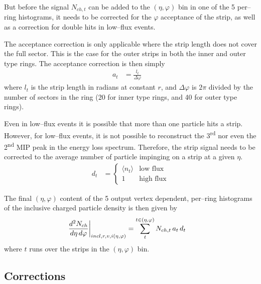 \documentclass[11pt]{article}
\newcommand{\dndetadphi}[1][]{{\ensuremath%
    \ifx|#1|\else\left.\fi%
    \frac{d^2N_{ch}}{d\eta\,d\varphi}%
    \ifx|#1|\else\right|_{#1}\fi%
}}
\begin{document}
But before the signal $N_{ch,t}$ can be added to the $(\eta,\varphi)$
bin in one of the 5 per--ring histograms, it needs to be corrected for
the $\varphi$ acceptance of the strip, as well as a correction for
double hits in low--flux events.   

The acceptance correction is only applicable where the strip length
does not cover the full sector.  This is the case for the outer strips
in both the inner and outer type rings.  The acceptance correction is
then simply 
\begin{align}
  \label{eq:acc_corr}
  a_t &= \frac{l_t}{\Delta\varphi}\quad
\end{align}
where $l_t$ is the strip length in radians at constant $r$, and
$\Delta\varphi$ is $2\pi$ divided by the number of sectors in the
ring (20 for inner type rings, and 40 for outer type rings). 

Even in low--flux events it is possible that more than one particle
hits a strip.  However, for low--flux events, it is not possible to
reconstruct the 3\textsuperscript{rd} nor even the
2\textsuperscript{nd} MIP peak in the energy loss spectrum.
Therefore, the strip signal needs to be corrected to the average
number of particle impinging on a strip at a given $\eta$.  
\begin{align}
  d_t &= \left\{\begin{array}{cl} \langle n_t\rangle & \text{low
        flux}\\
      1 & \text{high flux}
    \end{array}\right.
\end{align}

The final $(\eta,\varphi)$ content of the 5 output vertex dependent,
per--ring histograms of the inclusive charged particle density is then
given by
\begin{align}
  \label{eq:density}
  \dndetadphi[incl,r,v,i(\eta,\varphi)] &= \sum_t^{t\in(\eta,\varphi)}
  N_{ch,t}\,a_t\,d_t
\end{align}
where $t$ runs over the strips in the $(\eta,\varphi)$ bin. 

\subsection*{Corrections}
\end{document}
